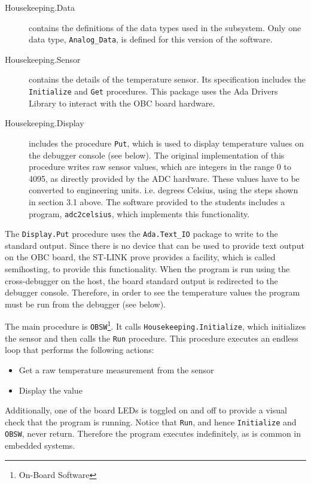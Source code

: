 \begin{description}
\item[Housekeeping.Data] contains the definitions of the data types used in the subsystem. Only one data type, {\tt Analog\_Data}, is defined for this version of the software.

\item[Housekeeping.Sensor] contains the details of the temperature sensor. Its specification includes the {\tt Initialize} and {\tt Get} procedures. This package uses the Ada Drivers Library to interact with the OBC board hardware.

\item[Housekeeping.Display] includes the procedure {\tt Put}, which is used to display temperature values on the debugger console (see below). The original implementation of this procedure writes raw sensor values, which are integers in the range 0 to 4095, as directly provided by the ADC hardware. These values have to be converted to engineering units. i.e. degrees Celsius, using the steps shown in section 3.1 above. The software provided to the students includes a program, {\tt adc2celsius}, which implements this functionality.
\end{description}

The {\tt Display.Put} procedure uses the {\tt Ada.Text\_IO} package to write to the standard output.  Since there is no device that can be used to provide text output on the OBC board, the ST-LINK prove provides a facility, which is called semihosting, to provide this functionality. When the program is run using the cross-debugger on the host, the board standard output is redirected to the debugger console. Therefore, in order to see the temperature values the program must be run from the debugger (see below).

The main procedure is {\tt OBSW}\footnote{On-Board Software}. It calls {\tt Housekeeping.Initialize}, which initializes the sensor and then calls the {\tt Run} procedure. This procedure executes an endless loop that performs the following actions:
\begin{itemize}
\item Get a raw temperature measurement from the sensor
\item Display the value
\end{itemize}

Additionally, one of the board LEDs is toggled on and off to provide a visual check that the program is running.
Notice that {\tt Run}, and hence {\tt Initialize} and {\tt OBSW}, never return. Therefore the program executes indefinitely, as is common in embedded systems.

